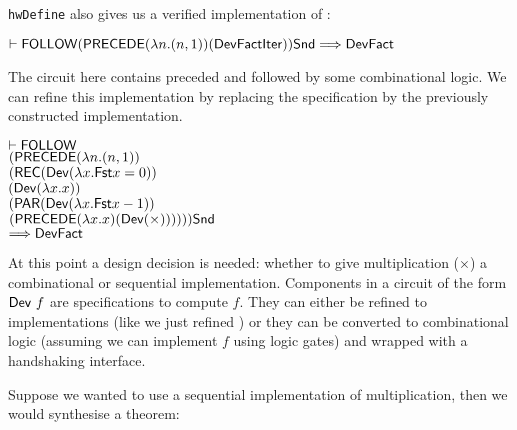 \vspace*{-2mm}

\noindent \texttt{hwDefine} also gives us a verified implementation of
:

\vspace*{-2mm}

{\baselineskip10pt\begin{alltt}
\( \vdash \DEF{FOLLOW} (\DEF{PRECEDE} ({\lambda}n. (n,1)) (\DEF{Dev} \DEF{FactIter})) \DEF{Snd} \Longrightarrow \DEF{Dev} \DEF{Fact} \)
\end{alltt}}

\vspace*{-2mm}

\noindent The circuit here contains  preceded and
followed by some combinational logic. We can refine this
implementation by replacing the specification
 by the previously constructed implementation.

\vspace*{-2mm}

{\baselineskip10pt\begin{alltt}
\( \vdash \DEF{FOLLOW}                                                                   \)
\(     (\DEF{PRECEDE} ({\lambda}n. (n,1))                                                \)
\(        (\DEF{REC} (\DEF{Dev} ({\lambda}x. \DEF{Fst} x = 0))                           \)
\(             (\DEF{Dev} ({\lambda}x. x))                                               \)
\(             (\DEF{PAR} (\DEF{Dev} ({\lambda}x. \DEF{Fst} x - 1))                      \)
\(                  (\DEF{PRECEDE} ({\lambda}x. x) (\DEF{Dev}({\times})))))) \DEF{Snd}   \)
\(    \Longrightarrow \DEF{Dev} \DEF{Fact}                                               \)
\end{alltt}}

\vspace*{-2mm}

At this point a design decision is needed: whether to give multiplication ($\times$)
a combinational or sequential implementation.
Components in a
circuit of the form $\mathsf{Dev}~f$ are specifications to compute
$f$. They can either be refined to implementations (like we just
refined ) or they can be converted to
combinational logic (assuming we can implement
$f$ using logic gates) and wrapped with a handshaking interface.

Suppose we wanted to use a sequential implementation of multiplication,
then we would synthesise a theorem:

